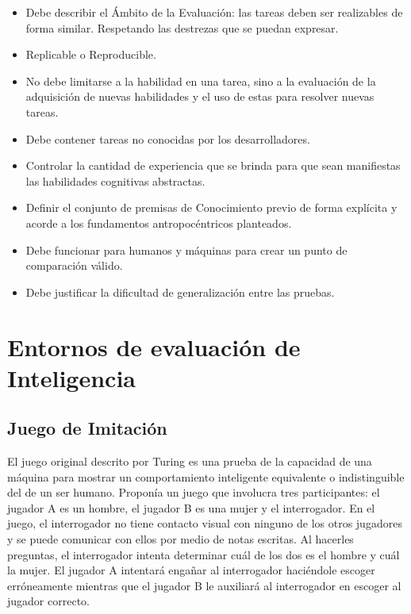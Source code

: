 \begin{itemize}
\item Debe describir el Ámbito de la Evaluación: las tareas deben ser realizables de forma similar. Respetando las destrezas que se puedan expresar.
\item Replicable o Reproducible.
\item No debe limitarse a la habilidad en una tarea, sino a la evaluación de la adquisición de nuevas habilidades y el uso de estas para resolver nuevas tareas.
\item Debe contener tareas no conocidas por los desarrolladores.
\item Controlar la cantidad de experiencia que se brinda para que sean manifiestas las habilidades cognitivas abstractas.
\item Definir el conjunto de premisas de Conocimiento previo de forma explícita y acorde a los fundamentos antropocéntricos planteados.
\item Debe funcionar para humanos y máquinas para crear un punto de comparación válido.
\item Debe justificar la dificultad de generalización entre las pruebas.
\end{itemize}

\section{Entornos de evaluación de Inteligencia}\label{section:state-of-the-art:inteligence-evaluation-enviroments}

\subsection{Juego de Imitación}

El juego original descrito por Turing es una prueba de la capacidad de una máquina para mostrar un comportamiento inteligente equivalente o indistinguible del de un ser humano. Proponía un juego que involucra tres participantes: el jugador A es un hombre, el jugador B es una mujer y el interrogador. En el juego, el interrogador no tiene contacto visual con ninguno de los otros jugadores y se puede comunicar con ellos por medio de notas escritas. Al hacerles preguntas, el interrogador intenta determinar cuál de los dos es el hombre y cuál la mujer. El jugador A intentará engañar al interrogador haciéndole escoger erróneamente mientras que el jugador B le auxiliará al interrogador en escoger al jugador correcto. 

